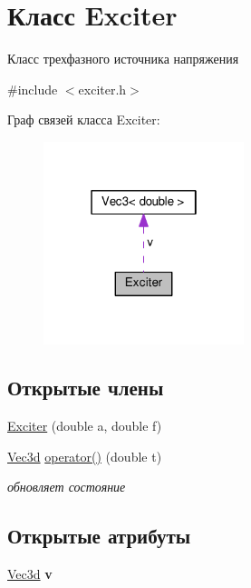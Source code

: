 \hypertarget{classExciter}{}\section{Класс Exciter}
\label{classExciter}


Класс трехфазного источника напряжения  




{\ttfamily \#include $<$exciter.\+h$>$}



Граф связей класса Exciter\+:\nopagebreak
\begin{figure}[H]
\begin{center}
\leavevmode
\includegraphics[width=166pt]{classExciter__coll__graph}
\end{center}
\end{figure}
\subsection*{Открытые члены}
\begin{DoxyCompactItemize}
\item 
\hyperlink{classExciter_a4d33a218b5cafd84cd55c8b51cd9246d}{Exciter} (double a, double f)
\item 
\hyperlink{structVec3}{Vec3d} \hyperlink{classExciter_a7dae2402806160fd5b7a12e9088b6c05}{operator()} (double t)
\begin{DoxyCompactList}\small\item\em обновляет состояние \end{DoxyCompactList}\end{DoxyCompactItemize}
\subsection*{Открытые атрибуты}
\begin{DoxyCompactItemize}
\item 
\mbox{\label{classExciter_a62ae9d6c77ca3876158db3405ccb0522}} 
\hyperlink{structVec3}{Vec3d} {\bfseries v}
\end{DoxyCompactItemize}


